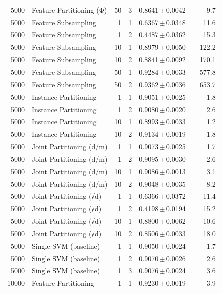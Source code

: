 \begin{table}[ht]
\begin{tabular}{rlrrccr}
5000 & Feature Partitioning (Φ) & 50 & 3 & 0.8641\,$\pm$\,0.0042 &  & 9.7 \\
5000 & Feature Subsampling & 1 & 1 & 0.6367\,$\pm$\,0.0348 &  & 11.6 \\
5000 & Feature Subsampling & 1 & 2 & 0.4487\,$\pm$\,0.0362 &  & 15.3 \\
5000 & Feature Subsampling & 10 & 1 & 0.8979\,$\pm$\,0.0050 &  & 122.2 \\
5000 & Feature Subsampling & 10 & 2 & 0.8841\,$\pm$\,0.0092 &  & 170.1 \\
5000 & Feature Subsampling & 50 & 1 & 0.9284\,$\pm$\,0.0033 &  & 577.8 \\
5000 & Feature Subsampling & 50 & 2 & 0.9362\,$\pm$\,0.0036 &  & 653.7 \\
5000 & Instance Partitioning & 1 & 1 & 0.9051\,$\pm$\,0.0025 &  & 1.8 \\
5000 & Instance Partitioning & 1 & 2 & 0.9080\,$\pm$\,0.0020 &  & 2.6 \\
5000 & Instance Partitioning & 10 & 1 & 0.8993\,$\pm$\,0.0033 &  & 1.2 \\
5000 & Instance Partitioning & 10 & 2 & 0.9134\,$\pm$\,0.0019 &  & 1.8 \\
5000 & Joint Partitioning (d/m) & 1 & 1 & 0.9073\,$\pm$\,0.0025 &  & 1.7 \\
5000 & Joint Partitioning (d/m) & 1 & 2 & 0.9095\,$\pm$\,0.0030 &  & 2.6 \\
5000 & Joint Partitioning (d/m) & 10 & 1 & 0.9086\,$\pm$\,0.0013 &  & 3.1 \\
5000 & Joint Partitioning (d/m) & 10 & 2 & 0.9048\,$\pm$\,0.0035 &  & 8.2 \\
5000 & Joint Partitioning (√d) & 1 & 1 & 0.6366\,$\pm$\,0.0372 &  & 11.4 \\
5000 & Joint Partitioning (√d) & 1 & 2 & 0.4198\,$\pm$\,0.0194 &  & 15.2 \\
5000 & Joint Partitioning (√d) & 10 & 1 & 0.8800\,$\pm$\,0.0062 &  & 10.6 \\
5000 & Joint Partitioning (√d) & 10 & 2 & 0.8506\,$\pm$\,0.0033 &  & 18.0 \\
5000 & Single SVM (baseline) & 1 & 1 & 0.9050\,$\pm$\,0.0024 &  & 1.7 \\
5000 & Single SVM (baseline) & 1 & 2 & 0.9070\,$\pm$\,0.0026 &  & 2.6 \\
5000 & Single SVM (baseline) & 1 & 3 & 0.9076\,$\pm$\,0.0024 &  & 3.6 \\
10000 & Feature Partitioning & 1 & 1 & 0.9230\,$\pm$\,0.0019 &  & 3.9 \\

\end{tabular}
\end{table}
